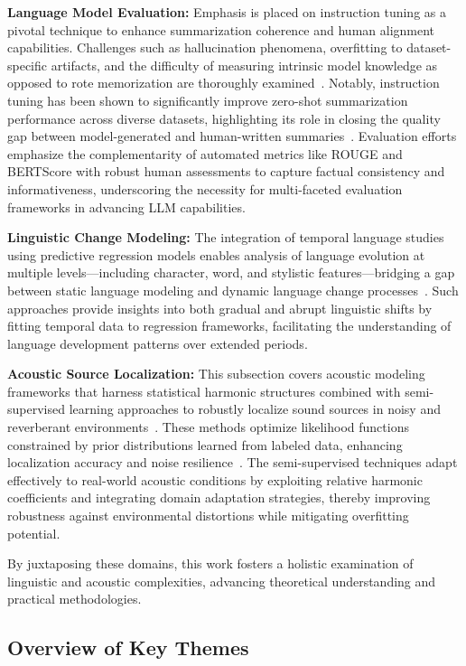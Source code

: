 \documentclass[sigconf]{acmart}
\begin{document}
\textbf{Language Model Evaluation:} Emphasis is placed on instruction tuning as a pivotal technique to enhance summarization coherence and human alignment capabilities. Challenges such as hallucination phenomena, overfitting to dataset-specific artifacts, and the difficulty of measuring intrinsic model knowledge as opposed to rote memorization are thoroughly examined~\cite{ref10,ref51,ref52}. Notably, instruction tuning has been shown to significantly improve zero-shot summarization performance across diverse datasets, highlighting its role in closing the quality gap between model-generated and human-written summaries~\cite{ref1}. Evaluation efforts emphasize the complementarity of automated metrics like ROUGE and BERTScore with robust human assessments to capture factual consistency and informativeness, underscoring the necessity for multi-faceted evaluation frameworks in advancing LLM capabilities.

\textbf{Linguistic Change Modeling:} The integration of temporal language studies using predictive regression models enables analysis of language evolution at multiple levels—including character, word, and stylistic features—bridging a gap between static language modeling and dynamic language change processes~\cite{ref41}. Such approaches provide insights into both gradual and abrupt linguistic shifts by fitting temporal data to regression frameworks, facilitating the understanding of language development patterns over extended periods.

\textbf{Acoustic Source Localization:} This subsection covers acoustic modeling frameworks that harness statistical harmonic structures combined with semi-supervised learning approaches to robustly localize sound sources in noisy and reverberant environments~\cite{ref1,ref2,ref3,ref26,ref51,ref52}. These methods optimize likelihood functions constrained by prior distributions learned from labeled data, enhancing localization accuracy and noise resilience~\cite{ref52}. The semi-supervised techniques adapt effectively to real-world acoustic conditions by exploiting relative harmonic coefficients and integrating domain adaptation strategies, thereby improving robustness against environmental distortions while mitigating overfitting potential.

By juxtaposing these domains, this work fosters a holistic examination of linguistic and acoustic complexities, advancing theoretical understanding and practical methodologies.

\subsection{Overview of Key Themes}
\end{document}
